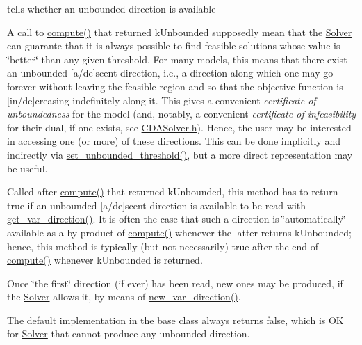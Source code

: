 tells whether an unbounded direction is available 

A call to \mbox{\hyperlink{class_s_m_spp__di__unipi__it_1_1_solver_a504d4e3e174c7a518cc66156a8a45ce5}{compute()}} that returned k\+Unbounded supposedly mean that the \mbox{\hyperlink{class_s_m_spp__di__unipi__it_1_1_solver}{Solver}} can guarante that it is always possible to find feasible solutions whose value is \char`\"{}better\char`\"{} than any given threshold. For many models, this means that there exist an unbounded \mbox{[}a/de\mbox{]}scent direction, i.\+e., a direction along which one may go forever without leaving the feasible region and so that the objective function is \mbox{[}in/de\mbox{]}creasing indefinitely along it. This gives a convenient {\itshape certificate of unboundedness} for the model (and, notably, a convenient {\itshape certificate of infeasibility} for their dual, if one exists, see \mbox{\hyperlink{_c_d_a_solver_8h}{C\+D\+A\+Solver.\+h}}). Hence, the user may be interested in accessing one (or more) of these directions. This can be done implicitly and indirectly via \mbox{\hyperlink{class_s_m_spp__di__unipi__it_1_1_solver_ae1717d1363782e086aa797e7437c0352}{set\+\_\+unbounded\+\_\+threshold()}}, but a more direct representation may be useful.

Called after \mbox{\hyperlink{class_s_m_spp__di__unipi__it_1_1_solver_a504d4e3e174c7a518cc66156a8a45ce5}{compute()}} that returned k\+Unbounded, this method has to return true if an unbounded \mbox{[}a/de\mbox{]}scent direction is available to be read with \mbox{\hyperlink{class_s_m_spp__di__unipi__it_1_1_solver_a4bc119810c0c2ee3ba0c48183f50aaf4}{get\+\_\+var\+\_\+direction()}}. It is often the case that such a direction is \char`\"{}automatically\char`\"{} available as a by-\/product of \mbox{\hyperlink{class_s_m_spp__di__unipi__it_1_1_solver_a504d4e3e174c7a518cc66156a8a45ce5}{compute()}} whenever the latter returns k\+Unbounded; hence, this method is typically (but not necessarily) true after the end of \mbox{\hyperlink{class_s_m_spp__di__unipi__it_1_1_solver_a504d4e3e174c7a518cc66156a8a45ce5}{compute()}} whenever k\+Unbounded is returned.

Once \char`\"{}the first\char`\"{} direction (if ever) has been read, new ones may be produced, if the \mbox{\hyperlink{class_s_m_spp__di__unipi__it_1_1_solver}{Solver}} allows it, by means of \mbox{\hyperlink{class_s_m_spp__di__unipi__it_1_1_solver_a673fc1c81a1fc86e55dfab3a37f303bc}{new\+\_\+var\+\_\+direction()}}.

The default implementation in the base class always returns false, which is OK for \mbox{\hyperlink{class_s_m_spp__di__unipi__it_1_1_solver}{Solver}} that cannot produce any unbounded direction. \mbox{\label{class_s_m_spp__di__unipi__it_1_1_solver_aa96263f4e0c59225f3f5d54f03fe31ee}} 
